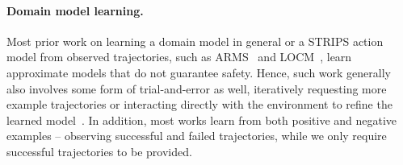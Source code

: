 \documentclass{article}
\begin{document}
	\paragraph{Domain model learning.}
	 Most prior work on learning a domain model in general or a STRIPS action model from observed trajectories, such as ARMS~\cite{yang2007learning} and LOCM~\cite{cresswell2013acquiring}, learn approximate models that do not guarantee safety. Hence, such work generally also involves some form of trial-and-error as well, iteratively requesting more example trajectories or interacting directly with the environment to refine the learned model~\cite{mourao2012learning,wang1994learning,wang1994learning,walsh2008efficientLearning,levine2006explanation,jimenez2013integrating}.
	In addition, most works learn from both positive and negative examples -- observing successful and failed trajectories, while we only require successful trajectories to be provided. 
	
	

	
\end{document}
